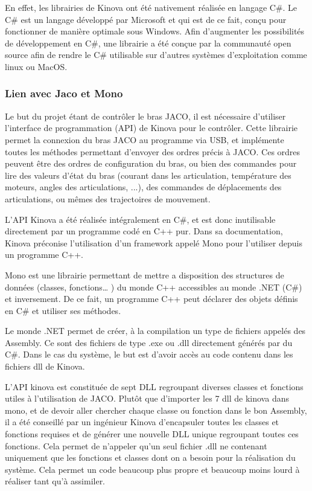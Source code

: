 \documentclass[letterpaper, twoside, 12pt, memoire, creativecommons, hyperref]{thETS}
\begin{document}
En effet, les librairies de Kinova ont été nativement réalisée en langage C\#. Le C\# est un langage développé par Microsoft et qui est de ce fait, conçu pour fonctionner de manière optimale sous Windows. Afin d'augmenter les possibilités de développement en C\#, une librairie a été conçue par la communauté open source afin de rendre le C\# utilisable sur d'autres systèmes d'exploitation comme linux ou MacOS.  

\subsubsection{Lien avec Jaco et Mono}\label{CHMono}

Le but du projet étant de contrôler le bras JACO, il est nécessaire d’utiliser l’interface de programmation (API) de Kinova pour le contrôler. Cette librairie permet la connexion du bras JACO au programme via USB, et implémente toutes les méthodes permettant d'envoyer des ordres précis à JACO. Ces ordres peuvent être des ordres de configuration du bras, ou bien des commandes pour lire des valeurs d'état du bras (courant dans les articulation, température des moteurs, angles des articulations, ...), des commandes de déplacements des articulations, ou mêmes des trajectoires de mouvement. 

L’API Kinova a été réalisée intégralement en C\#, et est donc inutilisable directement par un programme codé en C++ pur. Dans sa documentation, Kinova préconise l'utilisation d'un framework appelé Mono pour l'utiliser depuis un programme C++.

Mono est une librairie permettant de mettre a disposition des structures de données (classes, fonctions… ) du monde C++ accessibles au monde .NET (C\#) et inversement. De ce fait, un programme C++ peut déclarer des objets définis en C\# et utiliser ses méthodes.

Le monde .NET permet de créer, à la compilation un type de fichiers appelés des Assembly. Ce sont des fichiers de type .exe ou .dll directement générés par du C\#. Dans le cas du système, le but est d’avoir accès au code contenu dans les fichiers dll de Kinova.

L’API kinova est constituée de sept DLL regroupant diverses classes et fonctions utiles à l’utilisation de JACO. Plutôt que d’importer les 7 dll de kinova dans mono, et de devoir aller chercher chaque classe ou fonction dans le bon Assembly, il a été conseillé par un ingénieur Kinova d'encapsuler toutes les
classes et fonctions requises et de générer une nouvelle DLL unique regroupant toutes ces fonctions. Cela permet de n'appeler qu'un seul fichier .dll ne contenant uniquement que les fonctions et classes dont on a besoin pour la réalisation du système. Cela permet un code beaucoup plus propre et beaucoup moins lourd à réaliser tant qu’à assimiler.
\end{document}
